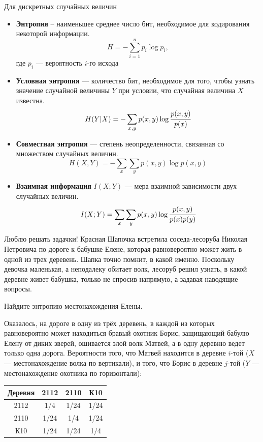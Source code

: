 \documentclass[final]{beamer}
\newlength{\onecolwid}
\begin{document}
\begin{frame}[t]
\begin{columns}[t]
\begin{column}{\onecolwid}
\begin{block}{Для дискретных случайных величин}
\begin{itemize}
	\item \textbf{Энтропия} -- наименьшее среднее число бит, необходимое для кодирования некоторой информации.
    \[H=-\sum\limits_{i=1}^n p_i\log p_i, \]
    где $p_i$ --- вероятность $i$-го исхода    
    \item \textbf{Условная энтропия} --- количество бит, необходимое для того, чтобы узнать значение случайной величины $Y$ при условии, что случайная величина $X$ известна.
    \[H(Y|X)=-\sum\limits_{x, y} p(x, y)\log \cfrac{p(x, y)}{p(x)} \]
    \item \textbf{Совместная энтропия} --- степень неопределенности, связанная со множеством случайных величин.
    \[H(X, Y)=-\sum\limits_{x}\sum\limits_{y} p(x, y)\log p(x ,y) \]
    \item \textbf{Взаимная информация} $I(X; Y)$ --- мера взаимной зависимости двух случайных величин.
    \[I(X; Y) = \sum\limits_{x}\sum\limits_{y} p(x, y)\log \cfrac{p(x, y)}{p(x)p(y)} \]
\end{itemize}
\end{block}


\begin{alertblock}{Люблю решать задачки!}
 Красная Шапочка встретила соседа-лесоруба Николая Петровича по дороге к бабушке Елене, которая равновероятно может жить в одной из трех деревень. Шапка точно помнит, в какой именно. Поскольку девочка маленькая, а неподалеку обитает волк, лесоруб решил узнать, в какой деревне живет бабушка, только не спросив напрямую, а задавая наводящие вопросы. 

	Найдите энтропию местонахождения Елены. 
\end{alertblock}	
\begin{alertblock}{}	
	Оказалось, на дороге в одну из трёх деревень, в каждой из которых равновероятно может находиться бравый охотник Борис, защищающий бабулю Елену от диких зверей, ошивается злой волк Матвей, а в одну деревню ведет только одна дорога. Вероятности того, что Матвей находится в деревне $i$-той ($X$ --- местонахождение волка по вертикали), и того, что Борис в деревне $j$-той ($Y$ --- местонахождение охотника по горизонтали):
	\begin{center}
		\begin{tabular}{c||c|c|c}
			Деревня & 2112 & 2110 & К10 \\
			\hline
			\hline
			2112 & 1/4 & 1/24 & 1/24 \\
			\hline
			2110 & 1/24 & 1/4 & 1/24 \\
			\hline
			К10 & 1/24 & 1/24 & 1/4 \\
		\end{tabular}
	\end{center}
	

\end{alertblock}
\end{column}
\end{columns}
\end{frame}
\end{document}
